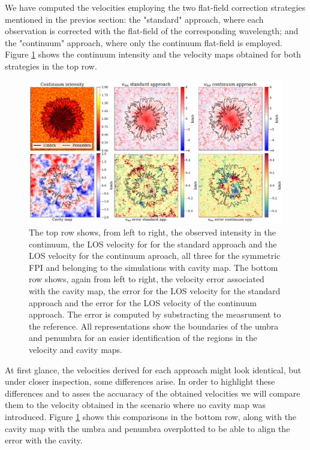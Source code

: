 We have computed the velocities employing the two flat-field correction strategies mentioned in the previos section: the "standard" approach, where each observation is corrected with the flat-field of the corresponding wavelength; and the "continuum" approach, where only the continuum flat-field is employed. Figure \ref{fig_mancha: int_and_vlos_examples} shows the continuum intensity and the velocity maps obtained for both strategies in the top row.  

\begin{figure}
  \includegraphics[width=\textwidth]{figures/Mancha/intensity_and_vlos_examples.pdf}
  \caption{
    The top row shows, from left to right, the observed intensity in the continuum, the LOS velocity for for the standard approach and the LOS velocity for the continuum aproach, all three for the symmetric FPI and belonging to the simulations with cavity map. The bottom row shows, again from left to right, the velocity error associated with the cavity map, the error for the LOS velocity for the standard approach and the error for the LOS velocity of the continuum approach. The error is computed by substracting the measrument to the reference. All representations show the boundaries of the umbra and penumbra for an easier identification of the regions in the velocity and cavity maps.   
    \label{fig_mancha: int_and_vlos_examples}}
\end{figure}

At first glance, the velocities derived for each approach might look identical, but under closer inspection, some differences arise. In order to highlight these differences and to asses the accuaracy of the obtained velocities we will compare them to the velocity obtained in the scenario where no cavity map was introduced. Figure \ref{fig_mancha: int_and_vlos_examples} shows this comparisons in the bottom row, along with the cavity map with the umbra and penumbra overplotted to be able to align the error with the cavity.   

